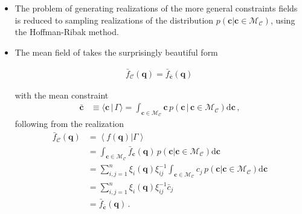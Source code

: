\documentclass[a4paper, 11pt]{article}
\begin{document}
\begin{itemize}
\item
The problem of generating realizations of the more general constraints fields is reduced to sampling realizations of the distribution $p(\bm{c}|\bm{c}\in \mathcal{M}_\mathcal{C})$, using the Hoffman-Ribak method.

\item
The mean field of takes the surprisingly beautiful form 
\begin{framed}
\begin{align}
\bar{f}_{\mathcal{C}}(\bm{q}) =\bar{f}_{\bar{\bm{c}}}(\bm{q})\,
\end{align}
\end{framed}
with the mean constraint
\begin{align}
\bar{\bm{c}} &\equiv \langle \bm{c} \,|\, \Gamma\rangle = \int_{\bm{c} \in \mathcal{M}_{\mathcal{C}}}  \bm{c}\, p(\bm{c}\,|\,\bm{c}\in \mathcal{M}_{\mathcal{C}}) \mathrm{d}\bm{c}\,,
\end{align}
following from the realization  
\begin{align}
\bar{f}_{\mathcal{C}}(\bm{q}) 
&=\left\langle f(\bm{q})|\Gamma\right \rangle \nonumber\\
&= \int_{\bm{c} \in \mathcal{M}_{\mathcal{C}}} \bar{f}_{\bm{c}}(\bm{q})\, p(\bm{c}|\bm{c}\in \mathcal{M}_{\mathcal{C}}) \mathrm{d}\bm{c}\nonumber\\
&= \sum_{i,j=1}^n\xi_i(\bm{q}) \xi_{ij}^{-1}\int_{\bm{c} \in \mathcal{M}_{\mathcal{C}}}  c_j\, p(\bm{c}|\bm{c}\in \mathcal{M}_{\mathcal{C}}) \mathrm{d}\bm{c}\nonumber\\
&= \sum_{i,j=1}^n \xi_i(\bm{q}) \xi_{ij}^{-1} \bar{c}_j\nonumber\\
&= \bar{f}_{\bar{\bm{c}}}(\bm{q})\,.
\end{align}


\end{itemize}
\end{document}
